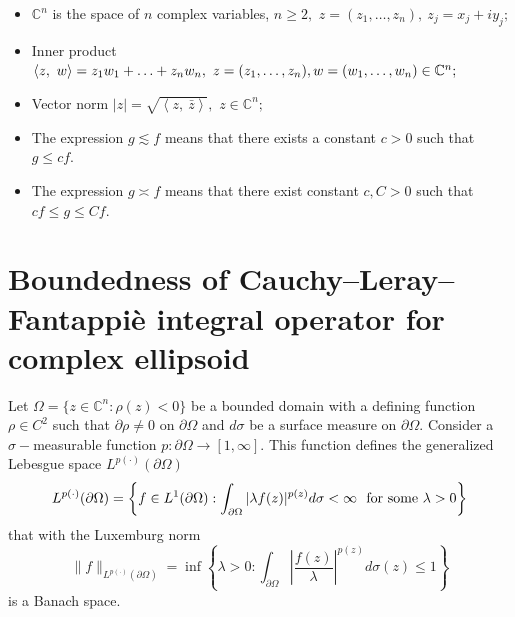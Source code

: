 \documentclass[review]{elsarticle}
\newcommand{\abs}[1]{\left\vert #1 \right\vert}
\newcommand{\scp}[2]{ \left\langle #1,\ #2  \right\rangle }
\newcommand{\Cn}{ \mathbb{C}^n }
\newcommand{\Om}{\Omega = \{z\in\Cn : \rho(z)<0\}}
\newcommand{\dom}{\partial\Omega}
\begin{document}
\begin{itemize}
	\item $\Cn$ is the space of $n$ complex variables, $n\geq 2,$ $z =
	(z_1,\ldots, z_n),\ z_j = x_j + i y_j;$
    \item Inner product 
    $\scp{z}{w} =
    z_1w_1+\ldots+z_nw_n,\ z=(z_1,\ldots,z_n),\\
    w=(w_1,\ldots,w_n)\in\Cn;
    $
    \item Vector norm  $|z|=\sqrt{\scp{z}{\bar{z}}},$ $z\in\Cn;$
    \item The expression $g\lesssim f$
     means that there exists a constant $c>0$ such that $g\leq c f.$
    \item The expression $g\asymp f$ means that there exist constant $c,C>0$ such that $cf\leq g\leq C f.$
%    
\end{itemize}


\section{Boundedness of Cauchy--Leray--Fantappi\`{e} integral operator for complex ellipsoid}

Let  $\Om$ be a bounded domain with a defining function $\rho\in
C^2$ such that $\partial\rho\neq 0$ on $\dom$ and $d\sigma$ be a
surface measure on $\dom.$ Consider a $\sigma-$measurable function
$p:\dom\to[1,\infty].$ This function defines the generalized Lebesgue
space $L^{p(\cdot)}(\partial\Omega)$
$$
 L^{p(\cdot)}(\partial\Omega) = \left\{f \in L^1(\dom) : \int_{\dom} |\lambda
f(z)|^{p(z)}d\sigma<\infty\ \ \rm{for\ some}\ \lambda>0  \right\}
$$
that with the Luxemburg norm
$$
\|f\|_{L^{p(\cdot)}(\partial\Omega)} = \inf \left\{\lambda>0 : \int_{\dom} \left|
\frac{f(z)}{\lambda} \right|^{p(z)}d\sigma(z)\leq 1\right\}
$$
is a Banach space.
\end{document}
